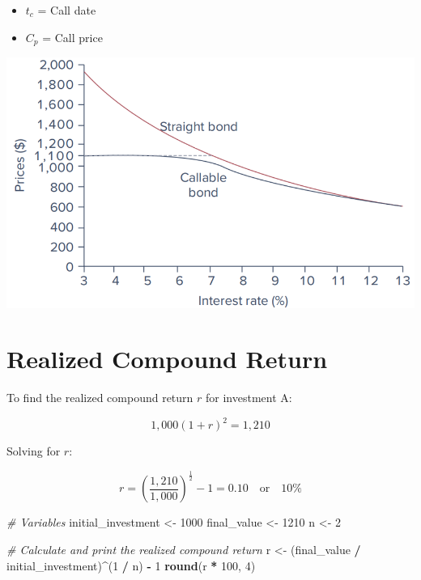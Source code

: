 \documentclass[
]{book}
\newenvironment{Shaded}{\begin{snugshade}}{\end{snugshade}}
\newcommand{\CommentTok}[1]{\textcolor[rgb]{0.56,0.35,0.01}{\textit{#1}}}
\newcommand{\DecValTok}[1]{\textcolor[rgb]{0.00,0.00,0.81}{#1}}
\newcommand{\FunctionTok}[1]{\textcolor[rgb]{0.13,0.29,0.53}{\textbf{#1}}}
\newcommand{\NormalTok}[1]{#1}
\newcommand{\OtherTok}[1]{\textcolor[rgb]{0.56,0.35,0.01}{#1}}
\newcommand{\SpecialCharTok}[1]{\textcolor[rgb]{0.81,0.36,0.00}{\textbf{#1}}}
\providecommand{\tightlist}{%
  \setlength{\itemsep}{0pt}\setlength{\parskip}{0pt}}
\begin{document}
\begin{itemize}
\tightlist
\item
  \(t_c\) = Call date
\item
  \(C_p\) = Call price
\end{itemize}

\includegraphics{Resources/callbond.png}

\hypertarget{realized-compound-return}{%
\section{Realized Compound Return}\label{realized-compound-return}}

To find the realized compound return \(r\) for investment A:

\[
1{,}000(1+r)^2 = 1{,}210
\]

Solving for \(r\):

\[
r = \left(\frac{1{,}210}{1{,}000}\right)^{\frac{1}{2}} - 1 = 0.10 \quad \text{or} \quad 10\%
\]

\begin{Shaded}
\begin{Highlighting}[]
\CommentTok{\# Variables}
\NormalTok{initial\_investment }\OtherTok{\textless{}{-}} \DecValTok{1000}
\NormalTok{final\_value }\OtherTok{\textless{}{-}} \DecValTok{1210}
\NormalTok{n }\OtherTok{\textless{}{-}} \DecValTok{2}

\CommentTok{\# Calculate and print the realized compound return}
\NormalTok{r }\OtherTok{\textless{}{-}}\NormalTok{ (final\_value }\SpecialCharTok{/}\NormalTok{ initial\_investment)}\SpecialCharTok{\^{}}\NormalTok{(}\DecValTok{1} \SpecialCharTok{/}\NormalTok{ n) }\SpecialCharTok{{-}} \DecValTok{1}
\FunctionTok{round}\NormalTok{(r }\SpecialCharTok{*} \DecValTok{100}\NormalTok{, }\DecValTok{4}\NormalTok{)}
\end{Highlighting}
\end{Shaded}
\end{document}
